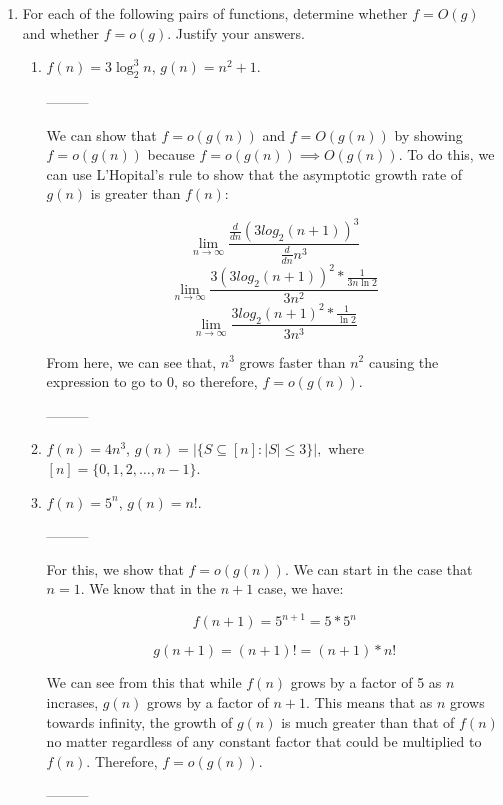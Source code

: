 \documentclass[11pt]{article}
\begin{document}
\begin{enumerate}
\begin{enumerate}
    \item For each of the following pairs of functions, determine whether $f=O(g)$ and whether $f=o(g)$.  Justify your answers.
    \begin{enumerate}
        \item $f(n) = 3\log_2^3 n$, $g(n) = n^2+1$.
        
        \smallskip
        
        ---------

        We can show that $f = o(g(n))$ and $f = O(g(n))$ by showing $f = o(g(n))$ because $f = o(g(n)) \implies O(g(n))$. To do this, we can use L'Hopital's rule to show that the
        asymptotic growth rate of $g(n)$ is greater than $f(n)$:

        $$ \lim_{n \rightarrow \infty} \frac{\frac{d}{dn} (3log_{2}(n+1))^3}{\frac{d}{dn}n^3} $$
        $$ \lim_{n \rightarrow \infty} \frac{3(3log_{2}(n+1))^2 * \frac{1}{3n \ln 2}}{3n^2} $$
        $$ \lim_{n \rightarrow \infty} \frac{3log_{2}(n+1)^2 * \frac{1}{\ln 2}}{3n^3}$$

        From here, we can see that, $n^3$ grows faster than $n^2$ causing the expression to go to 0, so therefore, $f = o(g(n))$.

        ---------

        \smallskip

        \item $f(n) = 4n^3$, $g(n)= \left| \{S \subseteq [n] : |S|\leq 3\}\right|,$ where $[n]=\{0,1,2,\ldots,n-1\}$.  
        \item $f(n) = 5^n$, $g(n)=n!$.
        
        \smallskip

        ---------

        For this, we show that $f = o(g(n))$. We can start in the case that $n = 1$. We know that in the $n + 1$ case, we have:

        $$ f(n + 1) = 5^{n + 1} = 5 * 5^n $$

        $$ g(n + 1) = (n + 1)! = (n + 1) * n! $$

        We can see from this that while $f(n)$ grows by a factor of 5 as $n$ incrases, $g(n)$ grows by a factor of $n + 1$.
        This means that as $n$ grows towards infinity, the growth of $g(n)$ is much greater than that of $f(n)$ no matter regardless of any
        constant factor that could be multiplied to $f(n)$. Therefore, $f = o(g(n))$.

        ---------


\end{enumerate}
\end{enumerate}
\end{enumerate}
\end{document}
